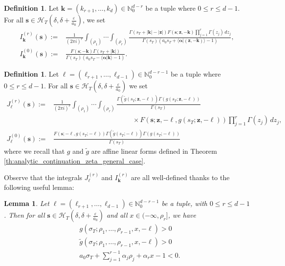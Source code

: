 \documentclass[a4paper,12pt]{article}
\newtheorem{lemm}[thm]{Lemma}
\theoremstyle{definition}
\newtheorem{definition}[thm]{Definition}
\numberwithin{equation}{section}
\newcommand{\dd}{d}
\newcommand{\ii}{i}
\begin{document}
\begin{definition}
Let $\mathbf{k}=(k_{r+1},\ldots,k_d) \in \mathbb{N}_0^{d-r}$ be a tuple where $0 \leq r \leq d-1$. For all $\mathbf{s} \in \mathcal{H}_T(\delta,\delta+\frac{\varepsilon}{a_0})$, we set
\begin{align}
    I^{(r)}_{\mathbf{k}}(\mathbf{s}):=&\frac{1}{(2\pi \ii)^r} \int_{(\rho_1)} \cdots \int_{(\rho_r)} \frac{\Gamma(s_T+|\mathbf{k}|-|\mathbf{z}|) F(\mathbf{s};\mathbf{z},-\mathbf{k}) \prod_{j=1}^r\Gamma(z_j) \, \dd z_j}{\Gamma(s_T)(a_0s_T+\langle \boldsymbol{\alpha}|(\mathbf{z},-\mathbf{k})\rangle-1)}, \label{eq:def_I_r} \\
    I^{(0)}_{\mathbf{k}}(\mathbf{s}):=& \frac{F(\mathbf{s};-\mathbf{k})\Gamma(s_T+|\mathbf{k}|)}{\Gamma(s_T)(a_0s_T-\langle \boldsymbol{\alpha}|\mathbf{k} \rangle-1)}. \nonumber
\end{align}
\end{definition}

\begin{definition}
Let $\boldsymbol{\ell}=(\ell_{r+1},\ldots,\ell_{d-1}) \in \mathbb{N}_0^{d-r-1}$ be a tuple where $0 \leq r \leq d-1$. For all $\mathbf{s} \in \mathcal{H}_T(\delta,\delta+\frac{\varepsilon}{a_0})$ we set
\begin{align}
    J^{(r)}_{\boldsymbol{\ell}}(\mathbf{s}):=& \frac{1}{(2\pi \ii)^r}\int_{(\rho_1)} \cdots \int_{(\rho_r)} \frac{\Gamma(\widetilde{g}(s_T;\mathbf{z},-\boldsymbol{\ell}))\Gamma(g(s_T;\mathbf{z},-\boldsymbol{\ell}))}{\Gamma(s_T)} \label{eq:def_J_r} \\
    & \hspace{139pt} \times F(\mathbf{s};\mathbf{z},-\boldsymbol{\ell},g(s_T;\mathbf{z},-\boldsymbol{\ell})) \prod_{j=1}^r \Gamma(z_j) \, \dd z_j ,\nonumber \\
    J^{(0)}_{\boldsymbol{\ell}}(\mathbf{s}):=& \frac{F(\mathbf{s};-\boldsymbol{\ell},g(s_T;-\boldsymbol{\ell})) \Gamma(\widetilde{g}(s_T;-\boldsymbol{\ell}))\Gamma(g(s_T;-\boldsymbol{\ell}))}{\Gamma(s_T)} \nonumber
\end{align}
where we recall that $g$ and $\widetilde{g}$ are affine linear forms defined in Theorem \ref{th:analytic_continuation_zeta_general_case}.
\end{definition}

Observe that the integrals $J^{(r)}_{\boldsymbol{\ell}}$ and $I^{(r)}_{\mathbf{k}}$ are all well-defined thanks to the following useful lemma:
\begin{lemm}
\label{lemma:ineq_l_tilde_l_delta_epsilon}
Let $\boldsymbol{\ell}=(\ell_{r+1},\ldots,\ell_{d-1}) \in \mathbb{N}_0^{d-r-1}$ be a tuple, with $0 \leq r \leq d-1$. Then for all $\mathbf{s} \in \mathcal{H}_T(\delta,\delta+\frac{\varepsilon}{a_0})$ and all $x \in (-\infty,\rho_r]$, we have
\begin{align}
    &g(\sigma_T;\rho_1,\ldots,\rho_{r-1},x,-\boldsymbol{\ell})>0 \label{eq:ineq_l_k} \\
    &\widetilde{g}(\sigma_T;\rho_1,\ldots,\rho_{r-1},x,-\boldsymbol{\ell})>0 \label{eq:ineq_tilde_l_k} \\
    &a_0\sigma_T+\sum_{j=1}^{r-1} \alpha_j \rho_j+\alpha_r x-1 <0. \label{eq:ineq_delta_epsilon}
\end{align}
\end{lemm}
\end{document}
